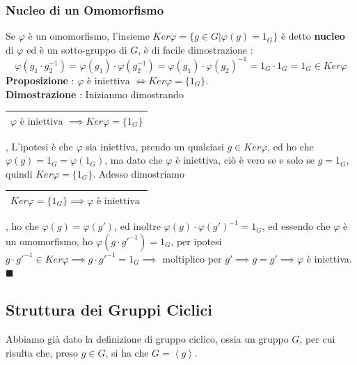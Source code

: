 \documentclass[12pt, letterpaper]{article}
\begin{document}
\subsubsection{Nucleo di un Omomorfismo}
Se \(\varphi\) è un omomorfismo, l'insieme \(Ker\varphi=\{g\in G|\varphi(g)=1_G\}\) è detto \textbf{nucleo} di 
\(\varphi\) ed è un sotto-gruppo di \(G\), è di facile dimostrazione : 
\begin{equation}
    \varphi(g_1\cdot g_2^{-1})=\varphi(g_1)\cdot\varphi(g_2^{-1})=\varphi(g_1)\cdot\varphi(g_2)^{-1}
    =1_G\cdot 1_G = 1_G \in Ker\varphi
\end{equation}
\textbf{Proposizione }: \(\varphi\text{ è iniettiva }\iff Ker\varphi=\{1_G\}\).\\
\textbf{Dimostrazione }: Inizianmo dimostrando 
\begin{tabular}{|c|}
    \hline
    \(\varphi\text{ è iniettiva }\implies Ker\varphi=\{1_G\}\) \\ \hline
    \end{tabular}
, 
L'ipotesi è che \(\varphi\) sia iniettiva, prendo un qualsiasi \(g\in Ker\varphi\), ed ho che 
\(\varphi(g)=1_G=\varphi(1_G)\), ma dato che \(\varphi\) è iniettiva, ciò è vero se e 
solo se \(g=1_G\), quindi \(Ker\varphi=\{1_G\}\). Adesso 
dimostriamo \begin{tabular}{|c|}
    \hline
    \(Ker\varphi=\{1_G\}\implies \varphi\text{ è iniettiva }\) \\ \hline
    \end{tabular}, ho che \(\varphi(g)=\varphi(g')\), ed inoltre 
    \(\varphi(g)\cdot \varphi(g')^{-1}=1_G\), ed essendo che \(\varphi\) è un 
    omomorfismo, ho  \(\varphi(g\cdot g'^{-1})=1_G\), per ipotesi \(g\cdot g'^{-1}\in Ker\varphi
    \implies g\cdot g'^{-1}=1_G\implies\) moltiplico per \(g'\implies g=g'\implies \varphi\) è iniettiva. \(\blacksquare\)
\subsection{Struttura dei Gruppi Ciclici}    
Abbiamo già dato la definizione di gruppo ciclico, ossia un gruppo \(G\), per cui risulta che,
preso \(g\in G\), si ha che \(G=\left\langle g\right\rangle\).\\
\end{document}
